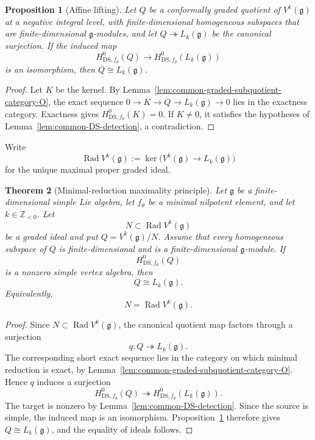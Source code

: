 \documentclass[11pt,reqno]{amsart}
\newtheorem{theorem}{Theorem}[section]
\newtheorem{proposition}[theorem]{Proposition}
\theoremstyle{definition}
\theoremstyle{remark}
\begin{document}
\begin{proposition}[Affine lifting]
\label{prop:common-affine-lifting}
Let $Q$ be a conformally graded quotient of $V^k(\mathfrak g)$ at a negative
integral level, with finite-dimensional homogeneous subspaces that are
finite-dimensional $\mathfrak g$-modules, and let
$Q\twoheadrightarrow L_k(\mathfrak g)$ be the canonical surjection.  If the
induced map
\[
 H^0_{\mathrm{DS},f_\theta}(Q)
 \longrightarrow
 H^0_{\mathrm{DS},f_\theta}(L_k(\mathfrak g))
\]
is an isomorphism, then $Q\cong L_k(\mathfrak g)$.
\end{proposition}

\begin{proof}
Let $K$ be the kernel.  By
Lemma~\ref{lem:common-graded-subquotient-category-O}, the exact sequence
$0\to K\to Q\to L_k(\mathfrak g)\to0$ lies in the exactness category.
Exactness gives $H^0_{\mathrm{DS},f_\theta}(K)=0$.  If $K\ne0$, it satisfies
the hypotheses of Lemma~\ref{lem:common-DS-detection}, a contradiction.
\end{proof}


Write
\[
 \operatorname{Rad}V^k(\mathfrak g)
 :=\ker\bigl(V^k(\mathfrak g)\to L_k(\mathfrak g)\bigr)
\]
for the unique maximal proper graded ideal.

\begin{theorem}[Minimal-reduction maximality principle]
\label{thm:common-minimal-reduction-maximality}
Let $\mathfrak g$ be a finite-dimensional simple Lie algebra, let
$f_\theta$ be a minimal nilpotent element, and let $k\in\mathbb Z_{<0}$.
Let
\[
 N\subset\operatorname{Rad}V^k(\mathfrak g)
\]
be a graded ideal and put $Q=V^k(\mathfrak g)/N$.  Assume that every
homogeneous subspace of $Q$ is finite-dimensional and is a
finite-dimensional $\mathfrak g$-module.  If
\[
 H^0_{\mathrm{DS},f_\theta}(Q)
\]
is a nonzero simple vertex algebra, then
\[
 Q\cong L_k(\mathfrak g).
\]
Equivalently,
\[
 N=\operatorname{Rad}V^k(\mathfrak g).
\]
\end{theorem}

\begin{proof}
Since $N\subset\operatorname{Rad}V^k(\mathfrak g)$, the canonical quotient
map factors through a surjection
\[
 q:Q\twoheadrightarrow L_k(\mathfrak g).
\]
The corresponding short exact sequence lies in the category on which
minimal reduction is exact, by
Lemma~\ref{lem:common-graded-subquotient-category-O}.  Hence $q$ induces a
surjection
\[
 H^0_{\mathrm{DS},f_\theta}(Q)
 \twoheadrightarrow
 H^0_{\mathrm{DS},f_\theta}(L_k(\mathfrak g)).
\]
The target is nonzero by Lemma~\ref{lem:common-DS-detection}.  Since the
source is simple, the induced map is an isomorphism.
Proposition~\ref{prop:common-affine-lifting} therefore gives
$Q\cong L_k(\mathfrak g)$, and the equality of ideals follows.
\end{proof}
\end{document}
